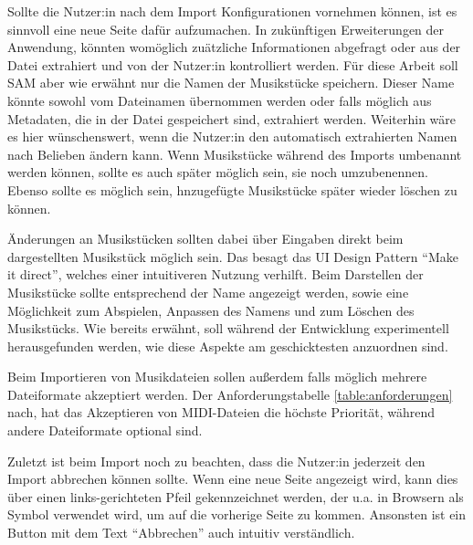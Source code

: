 Sollte die Nutzer:in nach dem Import Konfigurationen vornehmen können, ist es sinnvoll eine neue Seite dafür aufzumachen.
In zukünftigen Erweiterungen der Anwendung, könnten womöglich zuätzliche Informationen abgefragt oder aus der Datei extrahiert und von der Nutzer:in kontrolliert werden.
Für diese Arbeit soll \ac{SAM} aber wie erwähnt nur die Namen der Musikstücke speichern. Dieser Name könnte sowohl vom Dateinamen übernommen werden oder falls möglich aus Metadaten, die in der Datei gespeichert sind, extrahiert werden.
Weiterhin wäre es hier wünschenswert, wenn die Nutzer:in den automatisch extrahierten Namen nach Belieben ändern kann.
Wenn Musikstücke während des Imports umbenannt werden können, sollte es auch später möglich sein, sie noch umzubenennen.
Ebenso sollte es möglich sein, hnzugefügte Musikstücke später wieder löschen zu können.

Änderungen an Musikstücken sollten dabei über Eingaben direkt beim dargestellten Musikstück möglich sein.
Das besagt das UI Design Pattern \enquote{Make it direct}, welches einer intuitiveren Nutzung verhilft.
Beim Darstellen der Musikstücke sollte entsprechend der Name angezeigt werden, sowie eine Möglichkeit zum Abspielen, Anpassen des Namens und zum Löschen des Musikstücks.
Wie bereits erwähnt, soll während der Entwicklung experimentell herausgefunden werden, wie diese Aspekte am geschicktesten anzuordnen sind.

Beim Importieren von Musikdateien sollen außerdem falls möglich mehrere Dateiformate akzeptiert werden.
Der Anforderungstabelle \ref{table:anforderungen} nach, hat das Akzeptieren von \ac{MIDI}-Dateien die höchste Priorität, während andere Dateiformate optional sind.

Zuletzt ist beim Import noch zu beachten, dass die Nutzer:in jederzeit den Import abbrechen können sollte.
Wenn eine neue Seite angezeigt wird, kann dies über einen links-gerichteten Pfeil gekennzeichnet werden, der u.a. in Browsern als Symbol verwendet wird, um auf die vorherige Seite zu kommen.
Ansonsten ist ein Button mit dem Text \enquote{Abbrechen} auch intuitiv verständlich.


